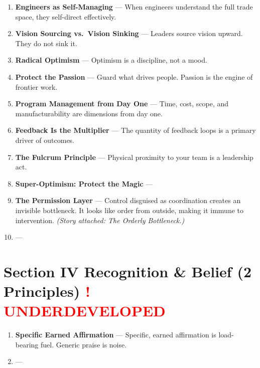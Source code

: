 \documentclass[11pt, letterpaper]{article}
\begin{document}
\begin{enumerate}[leftmargin=2em, label=\textbf{III.\arabic*.}]
  \item \textbf{Engineers as Self-Managing} ---
        When engineers understand the full trade space, they self-direct effectively.
  \item \textbf{Vision Sourcing vs.\ Vision Sinking} ---
        Leaders source vision upward. They do not sink it.
  \item \textbf{Radical Optimism} ---
        Optimism is a discipline, not a mood.
  \item \textbf{Protect the Passion} ---
        Guard what drives people. Passion is the engine of frontier work.
  \item \textbf{Program Management from Day One} ---
        Time, cost, scope, and manufacturability are dimensions from day one.
  \item \textbf{Feedback Is the Multiplier} ---
        The quantity of feedback loops is a primary driver of outcomes.
  \item \textbf{The Fulcrum Principle} ---
        Physical proximity to your team is a leadership act.
  \item \textbf{Super-Optimism: Protect the Magic} ---
  \item \textbf{The Permission Layer} ---
        Control disguised as coordination creates an invisible bottleneck.
        It looks like order from outside, making it immune to intervention.
        \textit{(Story attached: The Orderly Bottleneck.)}
  \item \textbf{\tbd[Principle 10]} ---
\end{enumerate}

\vspace{1em}

\section*{\color{principleblue} Section IV \quad Recognition \& Belief \quad
  \normalfont\small\color{midgray}(2 Principles) \quad
  \textcolor{red}{\small\bfseries \textbf{!} UNDERDEVELOPED}}
\vspace{0.5em}

\begin{enumerate}[leftmargin=2em, label=\textbf{IV.\arabic*.}]
  \item \textbf{Specific Earned Affirmation} ---
        Specific, earned affirmation is load-bearing fuel. Generic praise is noise.
  \item \textbf{\tbd[Principle 2]} ---
\end{enumerate}
\end{document}
